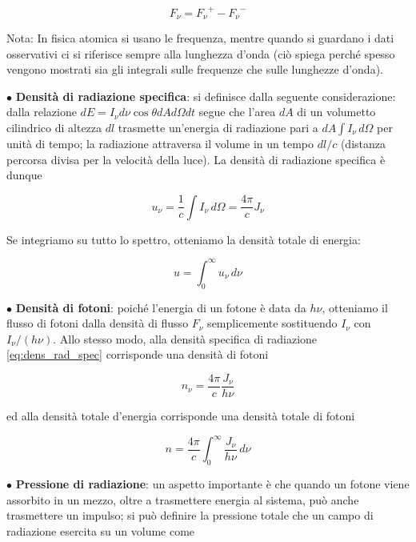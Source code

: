 \begin{equation*}
    {F_\nu} = {{F_\nu}^{+}} - {{F_\nu}^{-}}
\end{equation*}

Nota: In fisica atomica si usano le frequenza, mentre quando si guardano i dati osservativi ci si riferisce sempre alla lunghezza d'onda (ciò spiega perché spesso vengono mostrati sia gli integrali sulle frequenze che sulle lunghezze d'onda).

\vspace{0.2cm}$\bullet$ \textbf{Densità di radiazione specifica}: si definisce dalla seguente considerazione: dalla relazione $dE=I_{\nu} d \nu \cos{\theta} dA d \Omega dt$ segue che l'area $dA$ di un volumetto cilindrico di altezza $dl$ trasmette un'energia di radiazione pari a $dA \int I_{\nu} \, d\Omega$ per unità di tempo; la radiazione attraversa il volume in un tempo $dl/c$ (distanza percorsa divisa per la velocità della luce). La densità di radiazione specifica è dunque

\begin{equation}
    u_{\nu}=\frac{1}{c} \int I_{\nu} \, d\Omega=\frac{4 \pi}{c} J_{\nu}
    \label{eq:dens_rad_spec}
\end{equation}

Se integriamo su tutto lo spettro, otteniamo la densità totale di energia:

\begin{equation}
    u=\int_{0}^{\infty} u_{\nu} \, d\nu
    \label{eq:dens_rad_tot}
\end{equation}

$\bullet$ \textbf{Densità di fotoni}: poiché l'energia di un fotone è data da $h \nu$, otteniamo il flusso di fotoni dalla densità di flusso $F_{\nu}$ semplicemente sostituendo $I_{\nu}$ con $I_{\nu}/(h\nu)$. Allo stesso modo, alla densità specifica di radiazione \eqref{eq:dens_rad_spec} corrisponde una densità di fotoni

\begin{equation*}
    n_{\nu}=\frac{4 \pi}{c} \frac{J_{\nu}}{h \nu}
\end{equation*}

ed alla densità totale d'energia corrisponde una densità totale di fotoni

\begin{equation}
    n=\frac{4 \pi}{c} \int_{0}^{\infty} \frac{J_{\nu}}{h \nu} \, d\nu
\end{equation}

$\bullet$ \textbf{Pressione di radiazione}: un aspetto importante è che quando un fotone viene assorbito in un mezzo, oltre a trasmettere energia al sistema, può anche trasmettere un impulso; si può definire la pressione totale che un campo di radiazione esercita su un volume come

